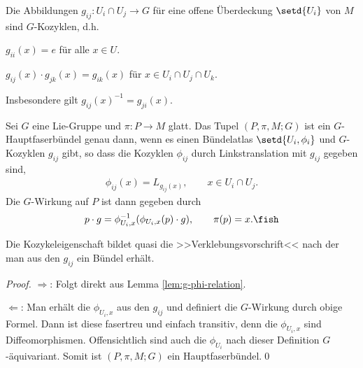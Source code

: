 \documentclass[%
	paper=a5,%
	fleqn,%
	DIV=18,%
	BCOR=0mm,
	fontsize=11pt,
	titlepage=false,%
	bibliography=totoc,
	DIV=18,%
	twoside=true,
	pdftitle=Riemannsche Geometrie,
	pdfauthor=Uwe Semmelmann,
	numbers=noendperiod]%
	{scrbook}
\begin{document}
\begin{lem}
Die Abbildungen $g_{ij}\colon U_i\cap U_j\to G$ für eine offene Überdeckung
$\setd{U_i}$ von $M$ sind $G$-Kozyklen, d.h.
\begin{propenum}
\item $g_{ii}(x) = e$ für alle $x\in U$.
\item $g_{ij}(x)\cdot g_{jk}(x) = g_{ik}(x)$ für $x\in U_i\cap U_j\cap U_k$.
\end{propenum}
Insbesondere gilt $g_{ij}(x)^{-1} = g_{ji}(x)$.\fish
\end{lem}

\begin{prop}
Sei $G$ eine Lie-Gruppe und $\pi\colon P\to M$ glatt. Das Tupel $(P,\pi,M;G)$ ist ein
$G$-Hauptfaserbündel genau dann, wenn es einen Bündelatlas
$\setd{U_i,\phi_{i}}$ und $G$-Kozyklen $g_{ij}$ gibt, so dass die Kozyklen
$\phi_{ij}$ durch Linkstranslation mit $g_{ij}$ gegeben sind,
\begin{align*}
\phi_{ij}(x) = L_{g_{ij}(x)},\qquad x\in U_i\cap U_j.
\end{align*}
Die $G$-Wirkung auf $P$ ist dann gegeben durch
\begin{align*}
p\cdot g = \phi_{U_i,x}^{-1}(\phi_{U_i,x}(p)\cdot g),\qquad \pi(p) = x.\fish
\end{align*}
\end{prop}

Die Kozykeleigenschaft bildet quasi die >>Verklebungsvorschrift<< nach der man
aus den $g_{ij}$ ein Bündel erhält.


\begin{proof}
$\Rightarrow$: Folgt direkt aus Lemma \ref{lem:g-phi-relation}.

$\Leftarrow$: Man erhält die $\phi_{U_i,x}$ aus den $g_{ij}$ und definiert die
$G$-Wirkung durch obige Formel. Dann ist diese fasertreu und einfach transitiv,
denn die $\phi_{U_i,x}$ sind Diffeomorphismen. Offensichtlich sind auch die $\phi_{U_i}$ nach dieser Definition $G$-äquivariant.
Somit ist $(P,\pi,M;G)$ ein Hauptfaserbündel.\qed
\end{proof}
\end{document}
